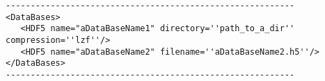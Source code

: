 \begin{lstlisting}[style=XML]
----------------------------------------------------------
<DataBases> 
   <HDF5 name="aDataBaseName1" directory=''path_to_a_dir'' compression=''lzf''/>
   <HDF5 name="aDataBaseName2" filename=''aDataBaseName2.h5''/>
</DataBases>
----------------------------------------------------------
\end{lstlisting}

